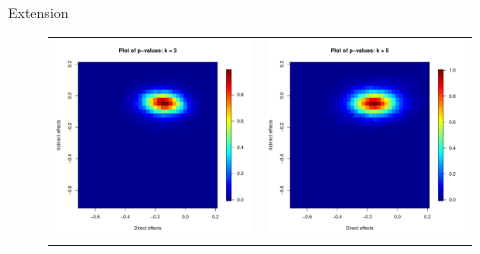 \documentclass[final]{beamer}
\newlength{\onecolwid}
\newlength{\onecolwidd}
\begin{document}
\begin{frame}[t]
\begin{columns}[t]
\begin{column}{\onecolwidd}
\begin{block}{Extension}
\begin{rmfamily}
	\hspace{2cm}
	\begin{figure}
	\centering
	\begin{tabular}{cc}
	\includegraphics[scale=0.7]{pvalues_figure_3nn.pdf} &
	\includegraphics[scale=0.7]{pvalues_figure_5nn.pdf} \\ 

\end{tabular}
\end{figure}
\end{rmfamily}
\end{block}
\end{column}
\end{columns}
\end{frame}
\end{document}
